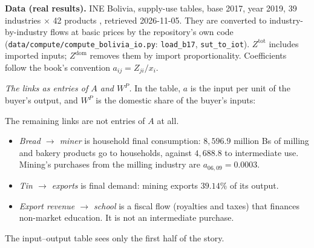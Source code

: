 \documentclass[../solutions_manual.tex]{subfiles}
\begin{document}
\textbf{Data (real results).} INE Bolivia, supply-use tables, base 2017, year 2019, 39 industries $\times$ 42 products \citep{ine2026sut}, retrieved 2026-11-05. They are converted to industry-by-industry flows at basic prices by the repository's own code (\texttt{data/compute/compute\_bolivia\_io.py}: \texttt{load\_b17}, \texttt{sut\_to\_iot}). $Z^{\text{tot}}$ includes imported inputs; $Z^{\text{dom}}$ removes them by import proportionality. Coefficients follow the book's convention $a_{ij} = Z_{ji}/x_i$.

 \emph{The links as entries of $A$ and $W^P$.} In the table, $a$ is the input per unit of the buyer's output, and $W^P$ is the domestic share of the buyer's inputs:
\begin{center}
\small
{}
\end{center}
The remaining links are not entries of $A$ at all.
\begin{itemize}
\item \emph{Bread $\to$ miner} is household final consumption: $8{,}596.9$ million Bs of milling and bakery products go to households, against $4{,}688.8$ to intermediate use. Mining's purchases from the milling industry are $a_{06,09} = 0.0003$.
\item \emph{Tin $\to$ exports} is final demand: mining exports $39.14\%$ of its output.
\item \emph{Export revenue $\to$ school} is a fiscal flow (royalties and taxes) that finances non-market education. It is not an intermediate purchase.
\end{itemize}
The input--output table sees only the first half of the story.
\end{document}
